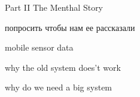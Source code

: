Part II The Menthal Story

попросить чтобы нам ее рассказали

mobile sensor data

why the old system does't work

why do we need a big system
